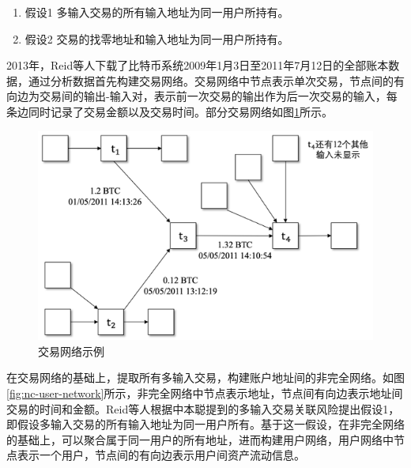 \begin{enumerate}
	\item 假设1 多输入交易的所有输入地址为同一用户所持有。
	\item 假设2 交易的找零地址和输入地址为同一用户所持有。
\end{enumerate}

2013年，Reid等人下载了比特币系统2009年1月3日至2011年7月12日的全部账本数据，通过分析数据首先构建交易网络。交易网络中节点表示单次交易，节点间的有向边为交易间的输出-输入对，表示前一次交易的输出作为后一次交易的输入，每条边同时记录了交易金额以及交易时间。部分交易网络如图\ref{fig:sub-network}所示。

\begin{figure}
\centering
\includegraphics[height=7cm]{figures/sub-network.png}
\caption{交易网络示例}
\label{fig:sub-network}
\end{figure}

在交易网络的基础上，提取所有多输入交易，构建账户地址间的非完全网络。如图\ref{fig:nc-user-network}所示，非完全网络中节点表示地址，节点间有向边表示地址间交易的时间和金额。Reid等人根据中本聪提到的多输入交易关联风险提出假设1，即假设多输入交易的所有输入地址为同一用户所有。基于这一假设，在非完全网络的基础上，可以聚合属于同一用户的所有地址，进而构建用户网络，用户网络中节点表示一个用户，节点间的有向边表示用户间资产流动信息。

